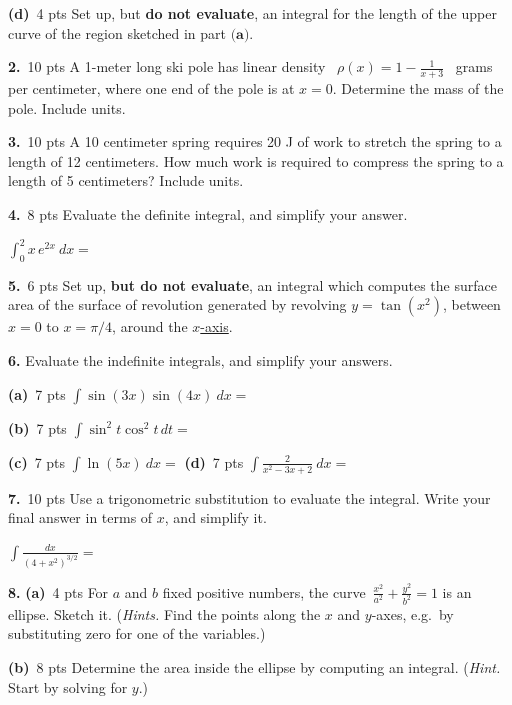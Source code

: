 \documentclass[12pt]{article}
\renewcommand{\emph}[1]{\textsf{\textbf{#1}}}
\let\ds\displaystyle
\newcommand{\prob}[1]{\bigskip\noindent\textbf{#1.} }
\newcommand{\pts}[1]{\,\textsf{#1 pts}}
\newcommand{\probpts}[2]{\prob{#1} \pts{#2} \quad}
\newcommand{\ppartpts}[2]{\textbf{(#1)} \pts{#2} \quad}
\newcommand{\epartpts}[2]{\medskip\noindent \textbf{(#1)} \pts{#2} \quad}
\begin{document}
\epartpts{d}{4} Set up, but \emph{do not evaluate}, an integral for the length of the upper curve of the region sketched in part $\textbf{(a)}$.
\vspace{1in}


\newpage
\probpts{2}{10} A 1-meter long ski pole has linear density \, $\ds \rho(x)=1-\frac{1}{x+3}$ \, grams per centimeter, where one end of the pole is at $x=0$.  Determine the mass of the pole.  Include units.\strut

\vfill

\probpts{3}{10} A 10 centimeter spring requires 20 J of work to stretch the spring to a length of 12 centimeters.  How much work is required to compress the spring to a length of 5 centimeters?  Include units.
\vfill


\newpage
\probpts{4}{8} Evaluate the definite integral, and simplify your answer.

\medskip \noindent  $\ds \int_0^2 x\, e^{2x}\: dx =$
\vfill


\probpts{5}{6}  Set up, \emph{but do not evaluate}, an integral which computes the surface area of the surface of revolution generated by revolving $y=\tan(x^2)$, between $x=0$ to $x=\pi/4$, around the \underline{$x$-axis}.
\vfill


\newpage
\prob{6} Evaluate the indefinite integrals, and simplify your answers.

\epartpts{a}{7} $\ds \int \sin(3x)\sin(4x)\: dx =$
\vfill

\epartpts{b}{7} $\ds \int \sin^2 t \cos^2 t\, dt =$
\vfill


\newpage
\epartpts{c}{7} $\ds \int \ln(5x) \: dx =$
\vfill
\epartpts{d}{7} $\ds \int \frac{2}{x^2 - 3x + 2} \: dx =$
\vfill


\newpage
\probpts{7}{10} Use a trigonometric substitution to evaluate the integral.  Write your final answer in terms of $x$, and simplify it.

\medskip
\noindent $\ds \int \frac{dx}{(4+x^2)^{3/2}} = $
\vfill


\newpage
\prob{8} \ppartpts{a}{4}  For $a$ and $b$ fixed positive numbers, the curve \,$\ds \frac{x^2}{a^2} + \frac{y^2}{b^2}=1$ is an ellipse.  Sketch it.  (\textsl{Hints.}  Find the points along the $x$ and $y$-axes, e.g.~by substituting zero for one of the variables.)

\vspace{2.5in}

\epartpts{b}{8}  Determine the area inside the ellipse by computing an integral.  (\textsl{Hint.}  Start by solving for $y$.)
\vfill
\end{document}
